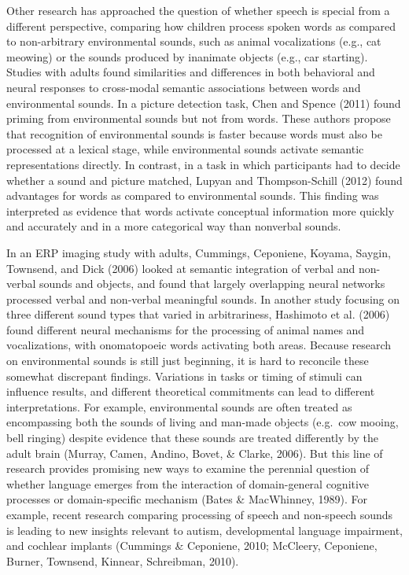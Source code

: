\documentclass[english,floatsintext,man]{apa6}
\newcounter{author}
\theoremstyle{definition}
\theoremstyle{definition}
\theoremstyle{definition}
\theoremstyle{remark}
\begin{document}
Other research has approached the question of whether speech is special
from a different perspective, comparing how children process spoken
words as compared to non-arbitrary environmental sounds, such as animal
vocalizations (e.g., cat meowing) or the sounds produced by inanimate
objects (e.g., car starting). Studies with adults found similarities and
differences in both behavioral and neural responses to cross-modal
semantic associations between words and environmental sounds. In a
picture detection task, Chen and Spence (2011) found priming from
environmental sounds but not from words. These authors propose that
recognition of environmental sounds is faster because words must also be
processed at a lexical stage, while environmental sounds activate
semantic representations directly. In contrast, in a task in which
participants had to decide whether a sound and picture matched, Lupyan
and Thompson-Schill (2012) found advantages for words as compared to
environmental sounds. This finding was interpreted as evidence that
words activate conceptual information more quickly and accurately and in
a more categorical way than nonverbal sounds.

In an ERP imaging study with adults, Cummings, Ceponiene, Koyama,
Saygin, Townsend, and Dick (2006) looked at semantic integration of
verbal and non-verbal sounds and objects, and found that largely
overlapping neural networks processed verbal and non-verbal meaningful
sounds. In another study focusing on three different sound types that
varied in arbitrariness, Hashimoto et al. (2006) found different neural
mechanisms for the processing of animal names and vocalizations, with
onomatopoeic words activating both areas. Because research on
environmental sounds is still just beginning, it is hard to reconcile
these somewhat discrepant findings. Variations in tasks or timing of
stimuli can influence results, and different theoretical commitments can
lead to different interpretations. For example, environmental sounds are
often treated as encompassing both the sounds of living and man-made
objects (e.g.~cow mooing, bell ringing) despite evidence that these
sounds are treated differently by the adult brain (Murray, Camen,
Andino, Bovet, \& Clarke, 2006). But this line of research provides
promising new ways to examine the perennial question of whether language
emerges from the interaction of domain-general cognitive processes or
domain-specific mechanism (Bates \& MacWhinney, 1989). For example,
recent research comparing processing of speech and non-speech sounds is
leading to new insights relevant to autism, developmental language
impairment, and cochlear implants (Cummings \& Ceponiene, 2010;
McCleery, Ceponiene, Burner, Townsend, Kinnear, Schreibman, 2010).
\end{document}
